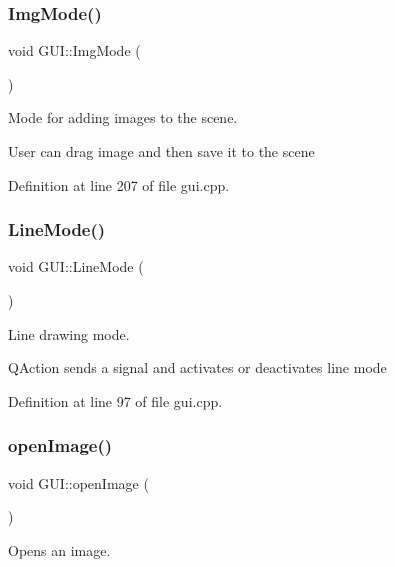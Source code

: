 \mbox{\label{classGUI_a5281fa4256d3ff14df9a95c1c6613bb2}} 
\subsubsection{\texorpdfstring{Img\+Mode()}{ImgMode()}}
{\footnotesize\ttfamily void G\+U\+I\+::\+Img\+Mode (\begin{DoxyParamCaption}{ }\end{DoxyParamCaption})}



Mode for adding images to the scene. 

User can drag image and then save it to the scene 

Definition at line 207 of file gui.\+cpp.

\mbox{\label{classGUI_a91fab5d31617ad5631d17dfceb5a0fad}} 
\subsubsection{\texorpdfstring{Line\+Mode()}{LineMode()}}
{\footnotesize\ttfamily void G\+U\+I\+::\+Line\+Mode (\begin{DoxyParamCaption}{ }\end{DoxyParamCaption})}



Line drawing mode. 

Q\+Action sends a signal and activates or deactivates line mode 

Definition at line 97 of file gui.\+cpp.

\mbox{\label{classGUI_a925c89bd7b32ccc8d726063ed8076f8f}} 
\subsubsection{\texorpdfstring{open\+Image()}{openImage()}}
{\footnotesize\ttfamily void G\+U\+I\+::open\+Image (\begin{DoxyParamCaption}{ }\end{DoxyParamCaption})}



Opens an image. 

